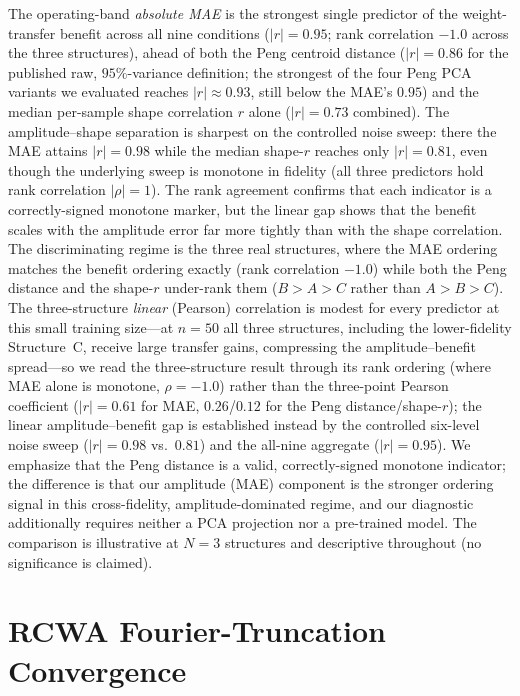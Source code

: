 \documentclass[11pt]{article}
\begin{document}
The operating-band \emph{absolute MAE} is the strongest single predictor of the
weight-transfer benefit across all nine conditions ($|r|=0.95$; rank correlation
$-1.0$ across the three structures), ahead of both the Peng centroid distance
($|r|=0.86$ for the published raw, $95\%$-variance definition; the strongest of the four Peng PCA variants we evaluated reaches $|r|\approx0.93$, still below the MAE's $0.95$) and the median per-sample shape correlation $r$ alone
($|r|=0.73$ combined). The amplitude--shape separation is sharpest on the controlled
noise sweep: there the MAE attains $|r|=0.98$ while the median shape-$r$ reaches only
$|r|=0.81$, even though the underlying sweep is monotone in fidelity (all three
predictors hold rank correlation $|\rho|=1$). The rank agreement confirms that each
indicator is a correctly-signed monotone marker, but the linear gap shows that the
benefit scales with the amplitude error far more tightly than with the shape
correlation. The discriminating regime is the three real structures, where the MAE
ordering matches the benefit ordering exactly (rank correlation $-1.0$) while both
the Peng distance and the shape-$r$ under-rank them ($B>A>C$ rather than $A>B>C$). The
three-structure \emph{linear} (Pearson) correlation is modest for every predictor at
this small training size---at $n=50$ all three structures, including the lower-fidelity
Structure~C, receive large transfer gains, compressing the amplitude--benefit spread---so
we read the three-structure result through its rank ordering (where MAE alone is monotone,
$\rho=-1.0$) rather than the three-point Pearson coefficient ($|r|=0.61$ for MAE,
$0.26$/$0.12$ for the Peng distance/shape-$r$); the linear amplitude--benefit gap is
established instead by the controlled six-level noise sweep ($|r|=0.98$ vs.\ $0.81$) and the
all-nine aggregate ($|r|=0.95$). We
emphasize that the Peng distance is a valid, correctly-signed monotone indicator;
the difference is that our amplitude (MAE) component is the stronger ordering signal in
this cross-fidelity, amplitude-dominated regime, and our diagnostic additionally
requires neither a PCA projection nor a pre-trained model. The comparison is
illustrative at $N=3$ structures and descriptive throughout (no significance is
claimed).


\section{RCWA Fourier-Truncation Convergence}
\label{sec:si_convergence}
\end{document}
